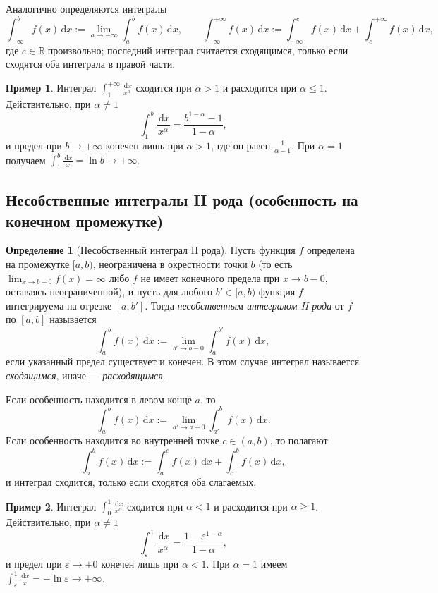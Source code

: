 \documentclass[12pt,a4paper]{article}
\theoremstyle{definition}
\newtheorem{definition}{Определение}[section]
\newtheorem{example}{Пример}[section]
\newcommand{\R}{\mathbb{R}}
\newcommand{\dd}{\,\mathrm{d}}
\newcommand{\eps}{\varepsilon}
\begin{document}
Аналогично определяются интегралы
\[
\int_{-\infty}^b f(x)\dd x := \lim_{a\to-\infty}\int_a^b f(x)\dd x,
\qquad
\int_{-\infty}^{+\infty} f(x)\dd x := \int_{-\infty}^c f(x)\dd x + \int_c^{+\infty} f(x)\dd x,
\]
где $c\in\R$ произвольно; последний интеграл считается сходящимся, только если сходятся оба интеграла в правой части.

\begin{example}
Интеграл $\displaystyle\int_1^{+\infty}\frac{\dd x}{x^\alpha}$ сходится при $\alpha>1$ и расходится при $\alpha\le 1$. Действительно, при $\alpha\ne 1$
\[
\int_1^b \frac{\dd x}{x^\alpha} = \frac{b^{1-\alpha}-1}{1-\alpha},
\]
и предел при $b\to+\infty$ конечен лишь при $\alpha>1$, где он равен $\frac{1}{\alpha-1}$. При $\alpha=1$ получаем $\int_1^b\frac{\dd x}{x}=\ln b\to+\infty$.
\end{example}

\subsection{Несобственные интегралы II рода (особенность на конечном промежутке)}

\begin{definition}[Несобственный интеграл II рода]\label{def:IIrod}
Пусть функция $f$ определена на промежутке $[a,b)$, неограничена в окрестности точки $b$ (то есть $\lim_{x\to b-0}f(x)=\infty$ либо $f$ не имеет конечного предела при $x\to b-0$, оставаясь неограниченной), и пусть для любого $b'\in[a,b)$ функция $f$ интегрируема на отрезке $[a,b']$. Тогда \emph{несобственным интегралом II рода} от $f$ по $[a,b]$ называется
\begin{equation}\label{eq:IIrod}
\int_a^b f(x)\dd x := \lim_{b'\to b-0}\int_a^{b'} f(x)\dd x,
\end{equation}
если указанный предел существует и конечен. В этом случае интеграл называется \emph{сходящимся}, иначе — \emph{расходящимся}.
\end{definition}

Если особенность находится в левом конце $a$, то
\[
\int_a^b f(x)\dd x := \lim_{a'\to a+0}\int_{a'}^b f(x)\dd x.
\]
Если особенность находится во внутренней точке $c\in(a,b)$, то полагают
\[
\int_a^b f(x)\dd x := \int_a^c f(x)\dd x + \int_c^b f(x)\dd x,
\]
и интеграл сходится, только если сходятся оба слагаемых.

\begin{example}
Интеграл $\displaystyle\int_0^1\frac{\dd x}{x^\alpha}$ сходится при $\alpha<1$ и расходится при $\alpha\ge 1$. Действительно, при $\alpha\ne 1$
\[
\int_{\eps}^1\frac{\dd x}{x^\alpha} = \frac{1-\eps^{1-\alpha}}{1-\alpha},
\]
и предел при $\varepsilon\to+0$ конечен лишь при $\alpha<1$. При $\alpha=1$ имеем $\int_\eps^1\frac{\dd x}{x}=-\ln\eps\to+\infty$.
\end{example}
\end{document}
